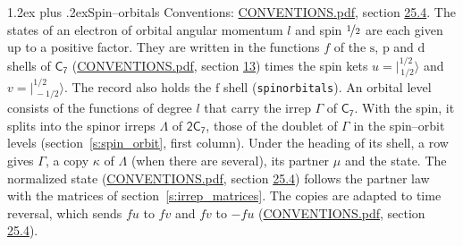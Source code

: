 \documentclass[10pt,a4paper]{article}
\makeatletter
\renewcommand\section{\@startsection{section}{1}{\z@}{-3ex plus -1ex minus -.2ex}%
  {1.2ex plus .2ex}{\normalfont\large\sffamily\bfseries\color{parttitle}}}
\numberwithin{equation}{section}
\newcommand{\grp}[1]{\mathsf{#1}}
\newcommand{\orbital}[1]{\mathrm{#1}}
\newcommand{\mult}{\kappa}
\newcommand{\intx}{\mu}
\newcommand{\jm}[2]{\bigl\lvert{}^{#1}_{\,#2}\bigr\rangle}
\makeatother
\begin{document}
\section{Spin--orbitals}\label{s:spin_orbitals}
Conventions: \href{../../CONVENTIONS.pdf}{CONVENTIONS.pdf}, section \href{../../CONVENTIONS.pdf\#conv.25.4}{25.4}.
\leavevmode\label{n:index.orbital.l}The states of an electron of orbital angular momentum $l$ and spin $\nicefrac{1}{2}$ are each given up to a positive factor. \label{n:local.spinor.uv}\label{n:local.function.f}They are written in the functions $f$ of the $\orbital{s}$, $\orbital{p}$ and $\orbital{d}$ shells of \href{../../../rotation/data/pdf/C7.pdf}{$\grp{C_{7}}$} (\href{../../CONVENTIONS.pdf}{CONVENTIONS.pdf}, section \href{../../../rotation/CONVENTIONS.pdf\#conv.13}{13}) times the spin kets $u = \jm{1/2}{1/2}$ and $v = \jm{1/2}{-1/2}$. The record also holds the $\orbital{f}$ shell (\texttt{spinorbitals}). An orbital level consists of the functions of degree $l$ that carry the irrep $\Gamma$ of \href{../../../rotation/data/pdf/C7.pdf}{$\grp{C_{7}}$}. With the spin, it splits into the spinor irreps $\Lambda$ of $\grp{2C_{7}}$, those of the doublet of $\Gamma$ in the spin--orbit levels (section~\ref{s:spin_orbit}, first column). \label{n:head.state}Under the heading of its shell, a row gives $\Gamma$, a copy $\mult$ of $\Lambda$ (when there are several), its partner $\intx$ and the state. The normalized state (\href{../../CONVENTIONS.pdf}{CONVENTIONS.pdf}, section \href{../../CONVENTIONS.pdf\#conv.25.4}{25.4}) follows the partner law with the matrices of section~\ref{s:irrep_matrices}. The copies are adapted to time reversal, which sends $f u$ to $f v$ and $f v$ to $-f u$ (\href{../../CONVENTIONS.pdf}{CONVENTIONS.pdf}, section \href{../../CONVENTIONS.pdf\#conv.25.4}{25.4}).
\end{document}
